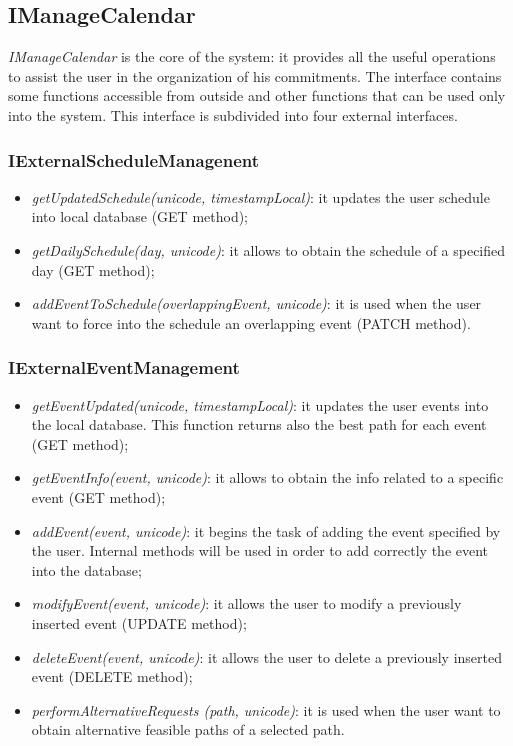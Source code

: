 \subsection{IManageCalendar}
\label{subsect: IManageCalendar}
\textit{IManageCalendar} is the core of the system: it provides all the useful operations to assist the user in the organization of his commitments. The interface contains some functions accessible from outside and other functions that can be used only into the system. This interface is subdivided into four external interfaces.

\subsubsection{IExternalScheduleManagenent}
\begin{itemize}
\item \textit{getUpdatedSchedule(unicode, timestampLocal)}: it updates the user schedule into local database (GET method);
\item \textit{getDailySchedule(day, unicode)}: it allows to obtain the schedule of a specified day (GET method);
\item \textit{addEventToSchedule(overlappingEvent, unicode)}: it is used when the user want to force into the schedule an overlapping event (PATCH method). 
\end{itemize}
\subsubsection{IExternalEventManagement}
\begin{itemize}
\item \textit{getEventUpdated(unicode, timestampLocal)}: it updates the user events into the local database. This function returns also the best path for each event (GET method);
\item \textit{getEventInfo(event, unicode)}: it allows to obtain the info related to a specific event (GET method);
\item \textit{addEvent(event, unicode)}: it begins the task of adding the event specified by the user. Internal methods will be used in order to add correctly the event into the database;
\item \textit{modifyEvent(event, unicode)}: it allows the user to modify a previously inserted event (UPDATE method);
\item \textit{deleteEvent(event, unicode)}: it allows the user to delete a previously inserted event (DELETE method);
\item \textit{performAlternativeRequests (path, unicode)}: it is used when the user want to obtain alternative feasible paths of a selected path.
\end{itemize}
